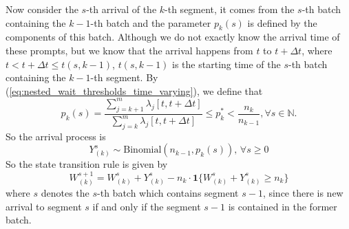 Now consider the $s$-th arrival of the $k$-th segment, it comes from the $s$-th batch containing the $k-1$-th batch and the parameter $p_k(s)$ is defined by the components of this batch. Although we do not exactly know the arrival time of these prompts, but we know that the arrival happens from $t$ to $t+\Delta t$, where $t<t+\Delta t \leq t(s,k-1)$, $t(s,k-1)$ is the starting time of the $s$-th batch containing the $k-1$-th segment. By (\ref{eq:nested_wait_thresholds_time_varying}), we define that
$$p_k(s) = \frac{\sum_{j=k+1}^m \lambda_j[ t, t+\Delta t ]}{\sum_{j=k}^m \lambda_j[ t, t+\Delta t ]}\leq p_k^* < \frac{n_k}{n_{k-1}}, \forall s \in \mathbb{N}.$$
So the arrival process is 
$$Y_{(k)}^s \sim \text{Binomial}(n_{k-1},p_k(s)),\, \forall s\geq 0$$
So the state transition rule is given by
$$W_{(k)}^{s+1} = W_{(k)}^{s} + Y_{(k)}^{s} - n_k \cdot\mathbf{1}\{ W_{(k)}^{s} + Y_{(k)}^{s}\geq n_k \} $$
where $s$ denotes the $s$-th batch which contains segment $s-1$, since there is new arrival to segment $s$ if and only if the segment $s-1$ is contained in the former batch.

